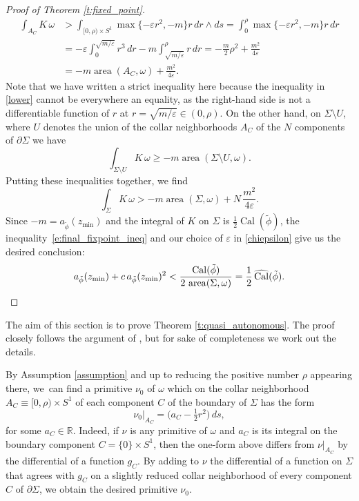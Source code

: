 \documentclass[JEP,XML,SOM,Unicode,published]{cedram}
\let\mathds\mathbb
\let\epsilon\varepsilon
\theoremstyle{definition}
\DeclareMathOperator{\area}{area}
\DeclareMathOperator{\Cal}{Cal}
\newcommand{\R}{\mathds{R}}
\begin{document}
\begin{proof}[Proof of Theorem \ref{t:fixed_point}]
\[
\begin{split}
\int_{A_C} K\, \omega
&>
\int_{[0,\rho) \times S^1} \max\{ -\epsilon r^2 , -m\} r\, dr\wedge ds
= \int_0^{\rho} \max\{ -\epsilon r^2 , -m\} r\, dr \\
&= - \epsilon \int_0^{\sqrt{m/\epsilon}}r^3\, dr - m \int_{\sqrt{m/\epsilon}}^{\rho} r\, dr = -\frac{m}{2} \rho^2 + \frac{m^2}{4\epsilon}\\
&
=
-m\area(A_C,\omega) + \frac{m^2}{4\epsilon}.
\end{split}
\]
Note that we have written a strict inequality here because the inequality in \eqref{lower} cannot be everywhere an equality, as the right-hand side is not a differentiable function of $r$ at $r=\sqrt{m/\epsilon} \in (0,\rho)$. On the other hand, on $\Sigma\setminus U$, where $U$ denotes the union of the collar neighborhoods $A_C$ of the $N$ components of $\partial \Sigma$ we have
\[
\int_{\Sigma\setminus U} K\, \omega \geq -m \area(\Sigma\setminus U,\omega).
\]
Putting these inequalities together, we find
\begin{equation}
\label{e:final_fixpoint_ineq}
\int_{\Sigma} K\, \omega > -m\area(\Sigma,\omega) + N \,\frac{m^2}{4\epsilon}.
\end{equation}
Since $-m=a_{\tilde{\phi}}(z_{\min})$ and the integral of $K$ on $\Sigma$ is $\tfrac12\Cal(\tilde{\phi})$, the inequality~\eqref{e:final_fixpoint_ineq} and our choice of $\epsilon$ in \eqref{chiepsilon} give us the desired conclusion:
\[
a_{\tilde{\phi}}(z_{\min}) + c\, a_{\tilde{\phi}}(z_{\min})^2
< \frac{\Cal(\tilde{\phi})}{ 2\, \area(\Sigma,\omega)} = \frac{1}{2} \, \widehat{\Cal}(\tilde{\phi}).
\qedhere
\]
\end{proof}

\label{ss:quasi_autonomous}

The aim of this section is to prove Theorem \ref{t:quasi_autonomous}. The proof closely follows the argument of \cite[\S 4]{Benedetti:2021aa}, but for sake of completeness we work out the details.

By Assumption \ref{assumption} and up to reducing the positive number $\rho$ appearing there, we~can find a primitive $\nu_0$ of $\omega$ which on the collar neighborhood $A_C\equiv [0,\rho)\times S^1$ of each component $C$ of the boundary of $\Sigma$ has the form
\begin{equation}
\label{e:lambda|_A}
\nu_0|_{A_C} = \bigl( a_C - \tfrac{1}{2} r^2 \bigr)\, ds,
\end{equation}
for some $a_C\in \R$. Indeed, if $\nu$ is any primitive of $\omega$ and $a_C$ is its integral on the boundary component $C = \{0\} \times S^1$, then the one-form above differs from $\nu|_{A_C}$ by the differential of a function $g_C$. By adding to $\nu$ the differential of a function on $\Sigma$ that agrees with $g_C$ on a slightly reduced collar neighborhood of every component $C$ of $\partial \Sigma$, we obtain the desired primitive $\nu_0$.
\end{document}
